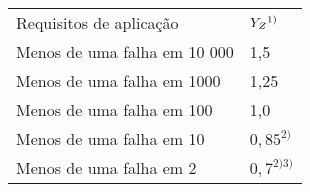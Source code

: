 \begin{table}[]
\begin{tabular}{ll}
Requisitos de aplicação      & $Y_Z \\ ^{1)}$    \\
Menos de uma falha em 10 000 & 1,5       \\
Menos de uma falha em 1000   & 1,25      \\
Menos de uma falha em 100    & 1,0       \\
Menos de uma falha em 10     & $0,85 ^{2)}$   \\
Menos de uma falha em 2      & $0,7^{2) 3)}$
\end{tabular}
\end{table}